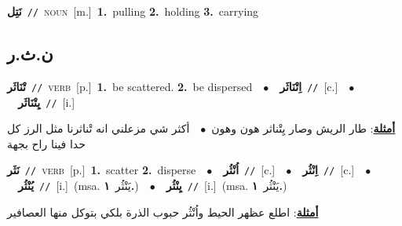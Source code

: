 \documentclass[10pt,a4paper,twoside]{article} %
\begin{document}
\begin{multicols}{2}
{\setlength\topsep{0pt}\textbf{\foreignlanguage{arabic}{نَتِل}}\ {\color{gray}\texttt{//}\color{black}}\ \textsc{noun}\ [m.]\ \textbf{1.}~pulling  \textbf{2.}~holding  \textbf{3.}~carrying\ } \vspace{2mm}

\vspace{-3mm}
\subsection*{\color{blue}\foreignlanguage{arabic}{ن.ث.ر}\color{blue}{}} 

{\setlength\topsep{0pt}\textbf{\foreignlanguage{arabic}{تْنَاثَر}}\ {\color{gray}\texttt{//}\color{black}}\ \textsc{verb}\ [p.]\ \textbf{1.}~be scattered.  \textbf{2.}~be dispersed\ \ $\bullet$\ \ \setlength\topsep{0pt}\textbf{\foreignlanguage{arabic}{اِتْنَاثَر}}\ {\color{gray}\texttt{//}\color{black}}\ [c.]\ \ $\bullet$\ \ \setlength\topsep{0pt}\textbf{\foreignlanguage{arabic}{يِتْنَاثَر}}\ {\color{gray}\texttt{//}\color{black}}\ [i.]\  \begin{flushright}\color{gray}\foreignlanguage{arabic}{\textbf{\underline{\foreignlanguage{arabic}{أمثلة}}}: طار الريش وصار يِتْناثر هون وهون\ $\bullet$\ \  أكثر شي مزعلني انه تْناثرنا مثل الرز كل حدا فينا راح بجهة}\end{flushright}\color{black}} \vspace{2mm}

{\setlength\topsep{0pt}\textbf{\foreignlanguage{arabic}{نَثَر}}\ {\color{gray}\texttt{//}\color{black}}\ \textsc{verb}\ [p.]\ \textbf{1.}~scatter  \textbf{2.}~disperse\ \ $\bullet$\ \ \setlength\topsep{0pt}\textbf{\foreignlanguage{arabic}{اُنْثُر}}\ {\color{gray}\texttt{//}\color{black}}\ [c.]\ \ $\bullet$\ \ \setlength\topsep{0pt}\textbf{\foreignlanguage{arabic}{اِنْثُر}}\ {\color{gray}\texttt{//}\color{black}}\ [c.]\ \ $\bullet$\ \ \setlength\topsep{0pt}\textbf{\foreignlanguage{arabic}{يُنْثُر}}\ {\color{gray}\texttt{//}\color{black}}\ [i.]\ \color{gray}(msa. \foreignlanguage{arabic}{يَنْثُر}~\foreignlanguage{arabic}{\textbf{١.}})\color{black}\ \ $\bullet$\ \ \setlength\topsep{0pt}\textbf{\foreignlanguage{arabic}{يِنْثُر}}\ {\color{gray}\texttt{//}\color{black}}\ [i.]\ \color{gray}(msa. \foreignlanguage{arabic}{يَنْثُر}~\foreignlanguage{arabic}{\textbf{١.}})\color{black}\  \begin{flushright}\color{gray}\foreignlanguage{arabic}{\textbf{\underline{\foreignlanguage{arabic}{أمثلة}}}: اطلع عظهر الحيط واُنْثُر حبوب الذرة بلكي بتوكل منها العصافير}\end{flushright}\color{black}} \vspace{2mm}


\end{multicols}
\end{document}
